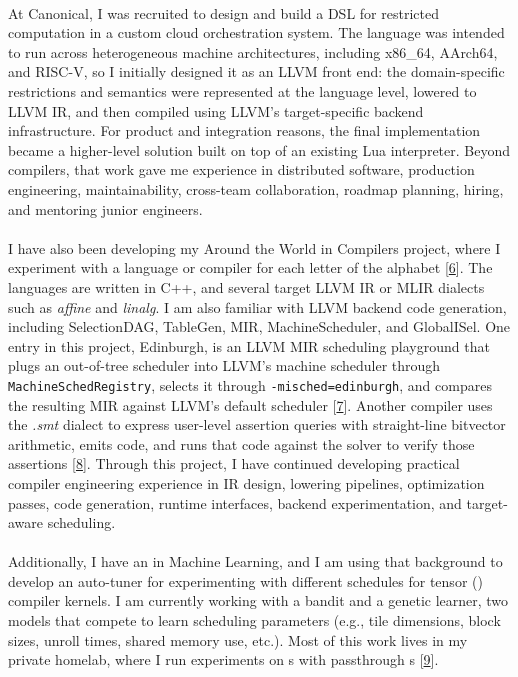 \paragraph{} %
At Canonical, I was recruited to design and build a DSL for restricted computation in a custom cloud orchestration system. The language was intended to run across heterogeneous machine architectures, including x86\_64, AArch64, and RISC-V, so I initially designed it as an LLVM front end: the domain-specific restrictions and semantics were represented at the language level, lowered to LLVM IR, and then compiled using LLVM's target-specific backend infrastructure. For product and integration reasons, the final implementation became a higher-level solution built on top of an existing Lua interpreter. Beyond compilers, that work gave me experience in distributed software, production engineering, maintainability, cross-team collaboration, roadmap planning, hiring, and mentoring junior engineers.

\paragraph{} %
I have also been developing my Around the World in Compilers project, where I experiment with a language or compiler for each letter of the alphabet [\href{\atwurl}{6}]. The languages are written in C++, and several target LLVM IR or MLIR dialects such as \emph{affine} and \emph{linalg}. I am also familiar with LLVM backend code generation, including SelectionDAG, TableGen, MIR, MachineScheduler, and GlobalISel. One entry in this project, Edinburgh, is an LLVM MIR scheduling playground that plugs an out-of-tree scheduler into LLVM's machine scheduler through \texttt{MachineSchedRegistry}, selects it through \texttt{-misched=edinburgh}, and compares the resulting MIR against LLVM's default scheduler [\href{\edinburghurl}{7}]. Another compiler uses the \emph{.smt} dialect to express user-level assertion queries with straight-line bitvector arithmetic, emits \emph{} code, and runs that code against the \emph{}  solver to verify those assertions [\href{\dublinlang}{8}]. Through this project, I have continued developing practical compiler engineering experience in IR design, lowering pipelines, optimization passes, code generation, runtime interfaces, backend experimentation, and target-aware scheduling.

\paragraph{} %
Additionally, I have an  in Machine Learning, and I am using that background to develop an auto-tuner for experimenting with different schedules for tensor () compiler kernels. I am currently working with a bandit and a genetic learner, two models that compete to learn scheduling parameters (e.g., tile dimensions, block sizes, unroll times, shared memory use, etc.). Most of this work lives in my private homelab, where I run experiments on s with passthrough  s [\href{\homelaburl}{9}].

